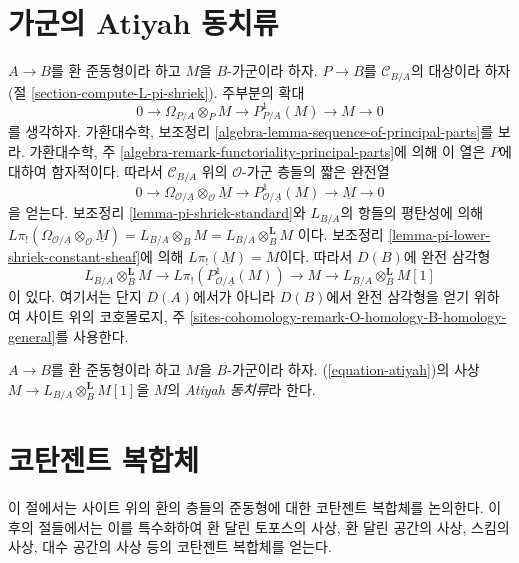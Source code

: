 \section{가군의 Atiyah 동치류}
\label{section-atiyah}

\noindent
$A \to B$를 환 준동형이라 하고 $M$을 $B$-가군이라 하자.
$P \to B$를 $\mathcal{C}_{B/A}$의 대상이라 하자(절
\ref{section-compute-L-pi-shriek}). 주부분의 확대
$$
0 \to \Omega_{P/A} \otimes_P M \to P^1_{P/A}(M) \to M \to 0
$$
를 생각하자. 가환대수학, 보조정리
\ref{algebra-lemma-sequence-of-principal-parts}를 보라. 가환대수학, 주
\ref{algebra-remark-functoriality-principal-parts}에 의해 이 열은 $P$에
대하여 함자적이다. 따라서 $\mathcal{C}_{B/A}$ 위의
$\mathcal{O}$-가군 층들의 짧은 완전열
$$
0 \to \Omega_{\mathcal{O}/\underline{A}} \otimes_\mathcal{O} \underline{M} \to
P^1_{\mathcal{O}/\underline{A}}(M) \to \underline{M} \to 0
$$
을 얻는다. 보조정리 \ref{lemma-pi-shriek-standard}와 $L_{B/A}$의 항들의
평탄성에 의해
$L\pi_!(\Omega_{\mathcal{O}/\underline{A}} \otimes_\mathcal{O} \underline{M})
= L_{B/A} \otimes_B M = L_{B/A} \otimes_B^\mathbf{L} M$
이다. 보조정리 \ref{lemma-pi-lower-shriek-constant-sheaf}에 의해
$L\pi_!(\underline{M}) = M$이다. 따라서 $D(B)$에 완전 삼각형
\begin{equation}
\label{equation-atiyah}
L_{B/A} \otimes_B^\mathbf{L} M \to
L\pi_!\left(P^1_{\mathcal{O}/\underline{A}}(M)\right) \to M
\to L_{B/A} \otimes_B^\mathbf{L} M [1]
\end{equation}
이 있다. 여기서는 단지 $D(A)$에서가 아니라 $D(B)$에서 완전 삼각형을
얻기 위하여 사이트 위의 코호몰로지, 주
\ref{sites-cohomology-remark-O-homology-B-homology-general}를 사용한다.

\begin{definition}
\label{definition-atiyah-class}
$A \to B$를 환 준동형이라 하고 $M$을 $B$-가군이라 하자.
(\ref{equation-atiyah})의 사상
$M \to L_{B/A} \otimes_B^\mathbf{L} M[1]$을 $M$의 {\it Atiyah 동치류}라
한다.
\end{definition}




\section{코탄젠트 복합체}
\label{section-cotangent-complex}

\noindent
이 절에서는 사이트 위의 환의 층들의 준동형에 대한 코탄젠트 복합체를
논의한다. 이후의 절들에서는 이를 특수화하여 환 달린 토포스의 사상,
환 달린 공간의 사상, 스킴의 사상, 대수 공간의 사상 등의 코탄젠트
복합체를 얻는다.

